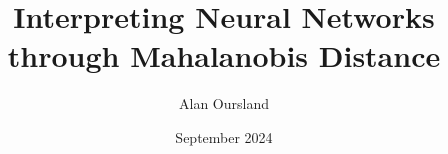 \documentclass[11pt]{article}
\title{Interpreting Neural Networks through Mahalanobis Distance}
\author{Alan Oursland}
\affil{Independent Researcher}
\date{September 2024}
\begin{document}
\maketitle

\begin{abstract}

\end{abstract}









\end{document}
